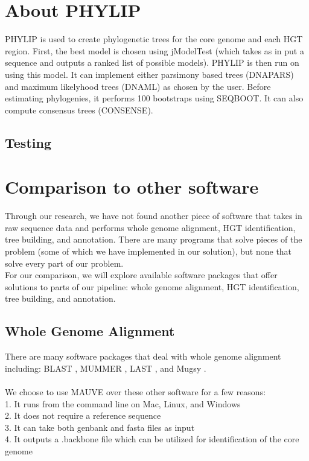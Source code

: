 \documentclass[12pt]{article}
\newcommand{\tab}{\hspace*{3em}}
\begin{document}
\section{About PHYLIP}
\tab PHYLIP is used to create phylogenetic trees for the core genome and each HGT region. First, the best model is chosen using jModelTest (which takes as in put a sequence and outputs a ranked list of possible models). PHYLIP is then run on using this model. It can implement either parsimony based trees (DNAPARS) and maximum likelyhood trees (DNAML) as chosen by the user. Before estimating phylogenies, it performs 100 bootstraps using SEQBOOT. It can also compute consensus trees (CONSENSE). 
\subsection{Testing}

\section{Comparison to other software}
\tab Through our research, we have not found another piece of software that takes in raw sequence data and performs whole genome alignment, HGT identification, tree building, and annotation. There are many programs that solve pieces of the problem (some of which we have implemented in our solution), but none that solve every part of our problem. \\
\tab For our comparison, we will explore available software packages that offer solutions to parts of our pipeline: whole genome alignment, HGT identification, tree building, and annotation.\\
\subsection{Whole Genome Alignment}
There are many software packages that deal with whole genome alignment including: BLAST \cite{Blast}, MUMMER \cite{Mummer}, LAST \cite{Last}, and Mugsy \cite{Mugsy}.\\
\\
We choose to use MAUVE \cite{mauve} over these other software for a few reasons:\\
\tab 1. It runs from the command line on Mac, Linux, and Windows\\
\tab 2. It does not require a reference sequence\\
\tab 3. It can take both genbank and fasta files as input\\
\tab 4. It outputs a .backbone file which can be utilized for identification of the core genome\\
\end{document}
